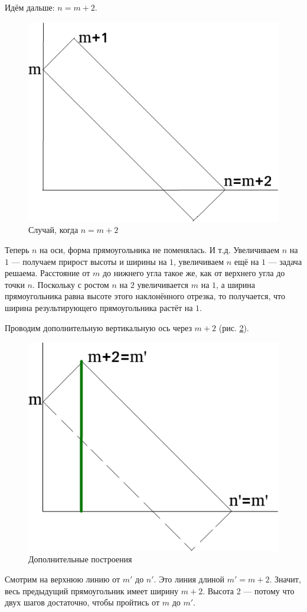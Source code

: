 \begin{enumerate}[label=\alph*)]
Идём дальше: $n = m + 2$.

\begin{figure}[h!]
  \centering
  \includegraphics[width=.6\textwidth]{./pictures/4_22_6.png}
  \caption{Случай, когда $n = m + 2$}
  \label{fig:4226}
\end{figure}

Теперь $n$ на оси, форма прямоугольника не поменялась.
И т.д.
Увеличиваем $n$ на $1$ --- получаем прирост высоты и ширины на $1$, увеличиваем $n$ ещё на $1$ --- задача решаема.
Расстояние от $m$ до нижнего угла такое же, как от верхнего угла до точки $n$.
Поскольку с ростом $n$ на $2$ увеличивается $m$ на $1$, а ширина прямоугольника равна высоте этого наклонённого отрезка, то получается, что ширина результирующего прямоугольника растёт на $1$.

Проводим дополнительную вертикальную ось через $m + 2$ (рис. \ref{fig:4227}).

\begin{figure}[h!]
  \centering
  \includegraphics[width=.6\textwidth]{./pictures/4_22_7.png}
  \caption{Дополнительные построения}
  \label{fig:4227}
\end{figure}

Смотрим на верхнюю линию от $m'$ до $n'$.
Это линия длиной $m' = m + 2$.
Значит, весь предыдущий прямоугольник имеет ширину $m + 2$.
Высота 2 --- потому что двух шагов достаточно, чтобы пройтись от $m$ до $m'$.


\end{enumerate}
